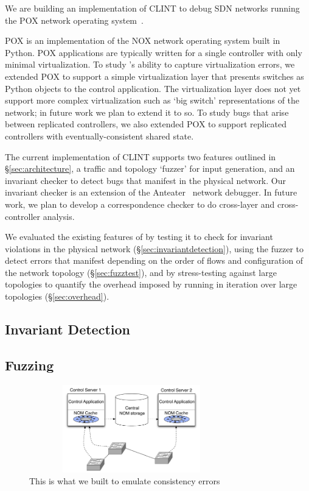 We are building an implementation of CLINT to debug SDN networks running the POX network operating system~\cite{pox}.

POX is an implementation of the NOX network operating system built in Python.
POX applications are typically written for a single controller with only minimal virtualization.
To study \projectname{}'s ability to capture virtualization errors, we extended POX
to support a simple virtualization layer that presents switches as Python objects to the control application.
The virtualization layer does not yet support more complex virtualization such as `big switch' representations 
of the network; in future work we plan to extend it to so.
To study bugs that arise between replicated controllers, we also extended POX to support replicated controllers
with eventually-consistent shared state.

The current implementation of CLINT supports two features outlined in \S\ref{sec:architecture}, a traffic and topology `fuzzer' for input generation, and an invariant checker to detect bugs that manifest in the physical network.
Our invariant checker is an extension of the Anteater~\cite{anteater} network debugger.
In future work, we plan to develop a correspondence checker to do cross-layer and cross-controller analysis.

We evaluated the existing features of \projectname{} by testing it to check for invariant violations in the physical network (\S\ref{sec:invariantdetection}), using the fuzzer to detect errors that manifest depending on the order of flows and configuration of the network topology (\S\ref{sec:fuzztest}), and by stress-testing \projectname{} against large topologies to quantify the overhead imposed by running \projectname{} in iteration over large topologies (\S\ref{sec:overhead}). 
\subsection{Invariant Detection}

\subsection{Fuzzing}


\begin{figure}[t]
    \hspace{-10pt}
    \includegraphics[height=1.5in, width=3.5in]{../diagrams/architecture/eventually_consistent_nom.pdf}
    \caption[]{\label{fig:eventually_consistent_nom} This is what we built to
    emulate consistency errors\vspace{-10pt}} 
\end{figure}

